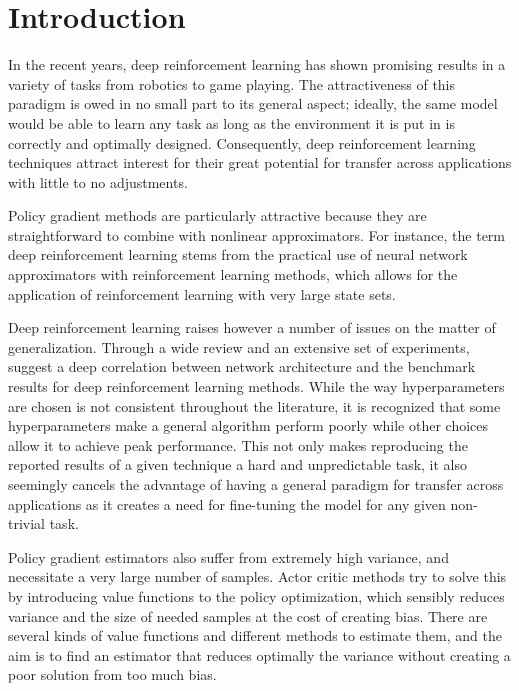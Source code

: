 \section{Introduction}
\label{sec:intro}

In the recent years, deep reinforcement learning has shown promising results in a variety of tasks from robotics to game playing. The attractiveness of this paradigm is owed in no small part to its general aspect; ideally, the same model would be able to learn any task as long as the environment it is put in is correctly and optimally designed. Consequently, deep reinforcement learning techniques attract interest for their great potential for transfer across applications with little to no adjustments.

Policy gradient methods are particularly attractive because they are straightforward to combine with nonlinear approximators. For instance, the term deep reinforcement learning stems from the practical use of neural network approximators with reinforcement learning methods, which allows for the application of reinforcement learning with very large state sets. 



Deep reinforcement learning raises however a number of issues on the matter of generalization. Through a wide review and an extensive set of experiments, \cite{henderson2017deep} suggest a deep correlation between network architecture and the benchmark results for deep reinforcement learning methods. While the way hyperparameters are chosen is not consistent throughout the literature, it is recognized that some hyperparameters make a general algorithm perform poorly while other choices allow it to achieve peak performance. This not only makes reproducing the reported results of a given technique a hard and unpredictable task, it also seemingly cancels the advantage of having a general paradigm for transfer across applications as it creates a need for fine-tuning the model for any given non-trivial task.

Policy gradient estimators also suffer from extremely high variance, and necessitate a very large number of samples. Actor critic methods try to solve this by introducing value functions to the policy optimization, which sensibly reduces variance and the size of needed samples at the cost of creating bias. There are several kinds of value functions and different methods to estimate them, and the aim is to find an estimator that reduces optimally the variance without creating a poor solution from too much bias.

